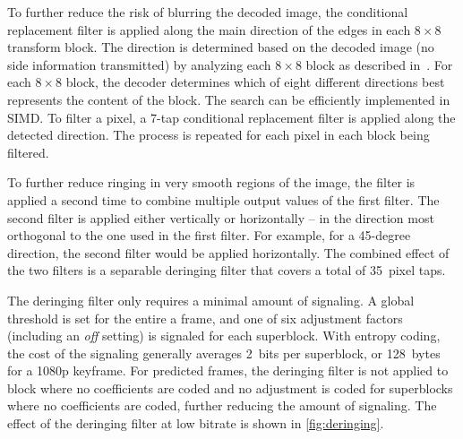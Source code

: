 \documentclass[english,conference,10pt]{IEEEtran}
\begin{document}
To further reduce the risk of blurring the decoded image, the conditional
replacement filter is applied along the main direction of the edges
in each $8\times 8$ transform block. The direction is determined based on the decoded image
(no side information transmitted) by analyzing each $8\times 8$ block as described
in~\cite{ValinDeringing}. For each $8\times 8$ block, the decoder determines which
of eight different directions best represents the content of the block.
The search can be efficiently implemented in SIMD\@. To filter a pixel, a 7-tap
conditional replacement filter is applied along the detected direction.
The process is repeated for each pixel in each block being filtered.

To further reduce ringing in very smooth regions of the image, the filter
is applied a second time to combine multiple output values of the
first filter. The second filter is applied either vertically or horizontally
-- in the direction most orthogonal to the one used in the first filter.
For example, for a 45-degree direction, the second filter would be
applied horizontally. The combined effect of the two filters is a separable
deringing filter that covers a total of 35~pixel taps.

The deringing filter only requires a minimal amount of signaling. A global threshold
is set for the entire a frame, and one of six adjustment factors (including an
\textit{off} setting) is signaled for each superblock. With entropy coding, the
cost of the signaling generally averages 2~bits per superblock, or 128~bytes for
a 1080p keyframe. For predicted frames, the deringing filter is not applied to
block where no coefficients are coded and no adjustment is coded for superblocks
where no coefficients are coded, further reducing the amount of signaling. The
effect of the deringing filter at low bitrate is shown in \cref{fig:deringing}.
\end{document}

